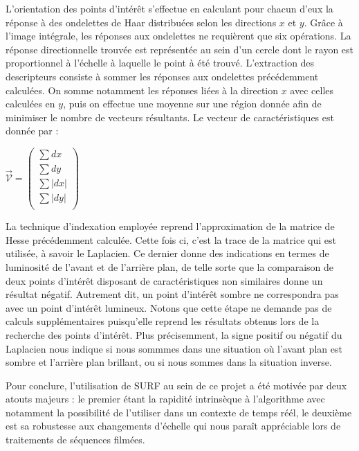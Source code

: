 	L'orientation des points d'intérêt s'effectue en calculant pour chacun d'eux la réponse à des ondelettes de Haar distribuées selon les directions $x$ et $y$. Grâce à l'image intégrale, les réponses aux ondelettes ne requièrent que six opérations. 
	La réponse directionnelle trouvée est représentée au sein d'un cercle dont le rayon est proportionnel à l'échelle à laquelle le point à été trouvé. 
	L'extraction des descripteurs consiste à sommer les réponses aux ondelettes précédemment calculées. On somme notamment les réponses liées à la direction $x$ avec celles calculées en $y$, puis on effectue une moyenne sur une région donnée afin de
	minimiser le nombre de vecteurs résultants. Le vecteur de caractéristiques est donnée par : 
	\begin{center}
	    $ \overrightarrow{\mathcal{V}} = \left( \begin{array}{c}
	    \sum{dx}	\\
	    \sum{dy}	\\
	    \sum{|dx|}	\\
	    \sum{|dy|}	\\
	  \end{array} \right)$
	\end{center}

	La technique d'indexation employée reprend l'approximation de la matrice de Hesse précédemment calculée. Cette fois ci, c'est la trace de la matrice qui est utilisée, à savoir le Laplacien. Ce dernier donne des indications en termes de 
	luminosité de l'avant et de l'arrière plan, de telle sorte que la comparaison de deux points d'intérêt disposant de caractéristiques non similaires donne un résultat négatif. Autrement dit, un point d'intérêt sombre ne correspondra
	pas avec un point d'intérêt lumineux. Notons que cette étape ne demande pas de calculs supplémentaires puisqu'elle reprend les résultats obtenus lors de la recherche des points d'intérêt. Plus précisemment, 
	la signe positif ou négatif du Laplacien nous indique si nous sommmes dans une situation où l'avant plan est sombre et l'arrière plan brillant, ou si nous sommes dans la situation inverse. 
	
	Pour conclure, l'utilisation de SURF au sein de ce projet a été motivée par deux atouts majeurs : le premier étant la rapidité intrinsèque à l'algorithme avec notamment la possibilité de l'utiliser dans un contexte de temps réél, 
	le deuxième est sa robustesse aux changements d'échelle qui nous paraît appréciable lors de traitements de séquences filmées.
	
